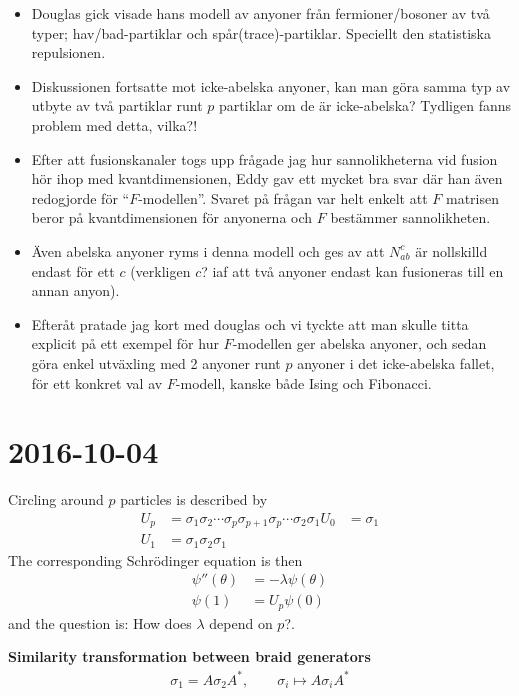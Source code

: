 \documentclass[a4paper,10pt,oneside]{book}
\theoremstyle{plain}
\theoremstyle{definition}
\theoremstyle{remark}
\begin{document}
{\begin{itemize}
  \item Douglas gick visade hans modell av anyoner från fermioner/bosoner av två typer; hav/bad-partiklar och spår(trace)-partiklar. Speciellt den statistiska repulsionen.
  \item Diskussionen fortsatte mot icke-abelska anyoner, kan man göra samma typ av utbyte av två partiklar runt $p$ partiklar om de är icke-abelska? Tydligen fanns problem med detta, vilka?!
  \item Efter att fusionskanaler togs upp frågade jag hur sannolikheterna vid fusion hör ihop med kvantdimensionen, Eddy gav ett mycket bra svar där han även redogjorde för ``$F$-modellen''. Svaret på frågan var helt enkelt att $F$ matrisen beror på kvantdimensionen för anyonerna och $F$ bestämmer sannolikheten.
  \item Även abelska anyoner ryms i denna modell och ges av att $N_{ab}^c$ är nollskilld endast för ett $c$ (verkligen $c$? iaf att två anyoner endast kan fusioneras till en annan anyon).
  \item Efteråt pratade jag kort med douglas och vi tyckte att man skulle titta explicit på ett exempel för hur $F$-modellen ger abelska anyoner, och sedan göra enkel utväxling med 2 anyoner runt $p$ anyoner i det icke-abelska fallet, för ett konkret val av $F$-modell, kanske både Ising och Fibonacci.
\end{itemize}



\section{2016-10-04}

Circling around $p$ particles is described by
\begin{align*}
  U_p &= \sigma_1 \sigma_2 \cdots \sigma_p \sigma_{p+1} \sigma_p \cdots \sigma_2 \sigma_1
  U_0 &= \sigma_1 \\
  U_1 &= \sigma_1 \sigma_2 \sigma_1
\end{align*}
The corresponding Schrödinger equation is then
\begin{align*}
  \psi''(\theta) &= -\lambda \psi(\theta) \\
  \psi(1) &= U_p \psi(0)
\end{align*}
and the question is: How does $\lambda$ depend on $p$?.

\textbf{Similarity transformation between braid generators}
\begin{align*}
  \sigma_1 = A \sigma_2 A^*, \quad \quad
  \sigma_i \mapsto A \sigma_i A^*
\end{align*}

}
\end{document}
